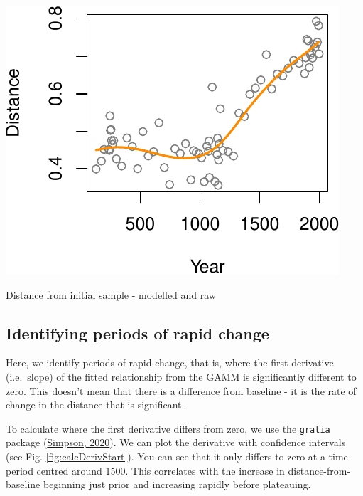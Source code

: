 \documentclass[nofonts,]{tufte-handout}
\begin{document}
\begin{marginfigure}
\includegraphics{Technical-supplement_files/figure-latex/distStartMod-1} \caption[Distance from initial sample - modelled and raw]{Distance from initial sample - modelled and raw}\label{fig:distStartMod}
\end{marginfigure}

\hypertarget{identifying-periods-of-rapid-change}{%
\subsection{Identifying periods of rapid
change}\label{identifying-periods-of-rapid-change}}

Here, we identify periods of rapid change, that is, where the first
derivative (i.e.~slope) of the fitted relationship from the GAMM is
significantly different to zero. This doesn't mean that there is a
difference from baseline - it is the rate of change in the distance that
is significant.

To calculate where the first derivative differs from zero, we use the
\texttt{gratia} package
(\protect\hyperlink{ref-simpson_2020_gratia}{Simpson, 2020}). We can
plot the derivative with confidence intervals (see Fig.
\ref{fig:calcDerivStart}). You can see that it only differs to zero at a
time period centred around 1500. This correlates with the increase in
distance-from-baseline beginning just prior and increasing rapidly
before plateauing.
\end{document}
